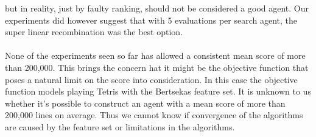 but in reality, just by faulty ranking, should
not be considered a good agent. Our experiments 
did however suggest that with 5 evaluations per search agent,
the super linear recombination was the best option.\\
\\
None of the experiments seen so far has allowed a 
consistent mean score of more 
than 200,000. This brings the concern 
hat it might be the objective function
that poses a natural limit on the score into consideration.
In this case the objective function
models playing Tetris with the Bertsekas feature set. 
It is unknown to us
whether it's possible to construct an agent 
with a mean score of more than
200,000 lines on average. 
Thus we cannot know if convergence 
of the algorithms are caused by the feature set or limitations in the
algorithms.